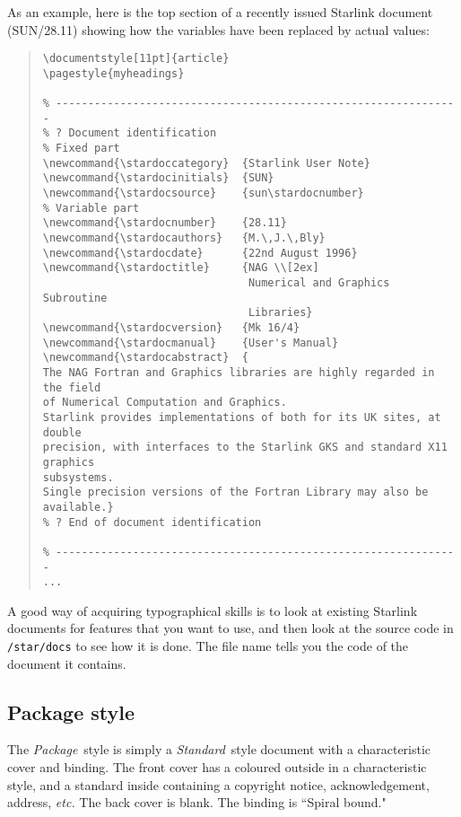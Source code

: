 As an example, here is the top section of a recently issued Starlink document
(SUN/28.11) showing how the variables have been replaced by actual values:

\begin{quote}
\begin{verbatim}
\documentstyle[11pt]{article}
\pagestyle{myheadings}

% ---------------------------------------------------------------
% ? Document identification
% Fixed part
\newcommand{\stardoccategory}  {Starlink User Note}
\newcommand{\stardocinitials}  {SUN}
\newcommand{\stardocsource}    {sun\stardocnumber}
% Variable part
\newcommand{\stardocnumber}    {28.11}
\newcommand{\stardocauthors}   {M.\,J.\,Bly}
\newcommand{\stardocdate}      {22nd August 1996}
\newcommand{\stardoctitle}     {NAG \\[2ex]
                                Numerical and Graphics Subroutine
                                Libraries}
\newcommand{\stardocversion}   {Mk 16/4}
\newcommand{\stardocmanual}    {User's Manual}
\newcommand{\stardocabstract}  {
The NAG Fortran and Graphics libraries are highly regarded in the field
of Numerical Computation and Graphics.
Starlink provides implementations of both for its UK sites, at double
precision, with interfaces to the Starlink GKS and standard X11 graphics
subsystems.
Single precision versions of the Fortran Library may also be available.}
% ? End of document identification

% ---------------------------------------------------------------
...
\end{verbatim}
\end{quote}

A good way of acquiring typographical skills is to look at existing Starlink
documents for features that you want to use, and then look at the source
code in {\tt /star/docs} to see how it is done.
The file name tells you the code of the document it contains.

\subsection{\label{package_style}Package style}

The {\em Package}\, style is simply a {\em Standard}\, style document with a
characteristic cover and binding.
The front cover has a coloured outside in a characteristic style, and a standard
inside containing a copyright notice, acknowledgement, address, {\em etc.}
The back cover is blank.
The binding is ``Spiral bound."

